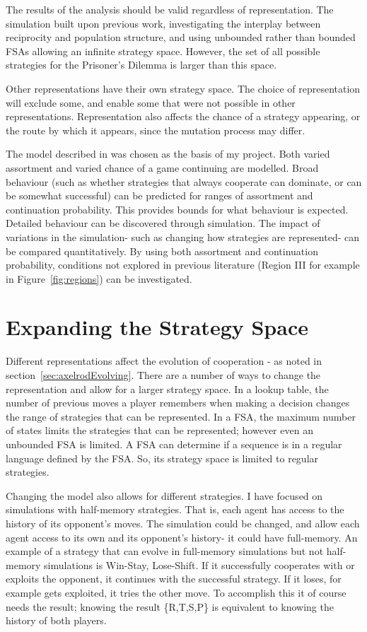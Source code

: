 \documentclass[a4paper,11pt]{article}
\begin{document}
The results of the analysis should be valid regardless of representation. The simulation built upon previous work, investigating the interplay between reciprocity and population structure, and using unbounded rather than bounded FSAs allowing an infinite strategy space. 
However, the set of all possible strategies for the Prisoner's Dilemma is larger than this space. 

Other representations have their own strategy space. 
The choice of representation will exclude some, and enable some that were not possible in other representations. 
Representation also affects the chance of a strategy appearing, or the route by which it appears, since the mutation process may differ.
 
The model described in \citet{van-veelen:PNAS:2012} was chosen as the basis of my project. 
Both varied assortment and varied chance of a game continuing are modelled. 
Broad behaviour (such as whether strategies that always cooperate can dominate, or can be somewhat successful) can be predicted for ranges of assortment and continuation probability. This provides bounds for what behaviour is expected. 
Detailed behaviour can be discovered through simulation. 
The impact of variations in the simulation- such as changing how strategies are represented- can be compared quantitatively.
By using both assortment and continuation probability, conditions not explored in previous literature (Region III for example in Figure~\ref{fig:regions}) can be investigated. 


\section{Expanding the Strategy Space}
\label{sec:stratspace}
Different representations affect the evolution of cooperation - as noted in section~\ref{sec:axelrodEvolving}. 
There are a number of ways to change the representation and allow for a larger strategy space. 
In a lookup table, the number of previous moves a player remembers when making a decision changes the range of strategies that can be represented. 
In a FSA, the maximum number of states limits the strategies that can be represented; however even an unbounded FSA is limited. 
A FSA can determine if a sequence is in a regular language defined by the FSA. 
So, its strategy space is limited to regular strategies. 

Changing the model also allows for different strategies. 
I have focused on simulations with half-memory strategies. 
That is, each agent has access to the history of its opponent's moves. 
The simulation could be changed, and allow each agent access to its own and its opponent's history- it could have full-memory. 
An example of a strategy that can evolve in full-memory simulations but not half-memory simulations is Win-Stay, Lose-Shift. If it successfully cooperates with or exploits the opponent, it continues with the successful strategy. If it loses, for example gets exploited, it tries the other move. 
To accomplish this it of course needs the result; knowing the result \{R,T,S,P\} is equivalent to knowing the history of both players.
\end{document}
